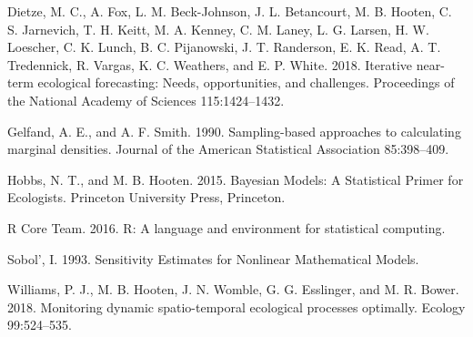 \documentclass[12pt,]{article}
\begin{document}
\leavevmode\hypertarget{ref-Dietze2018}{}%
Dietze, M. C., A. Fox, L. M. Beck-Johnson, J. L. Betancourt, M. B.
Hooten, C. S. Jarnevich, T. H. Keitt, M. A. Kenney, C. M. Laney, L. G.
Larsen, H. W. Loescher, C. K. Lunch, B. C. Pijanowski, J. T. Randerson,
E. K. Read, A. T. Tredennick, R. Vargas, K. C. Weathers, and E. P.
White. 2018. Iterative near-term ecological forecasting: Needs,
opportunities, and challenges. Proceedings of the National Academy of
Sciences 115:1424--1432.

\leavevmode\hypertarget{ref-Gelfand1990}{}%
Gelfand, A. E., and A. F. Smith. 1990. Sampling-based approaches to
calculating marginal densities. Journal of the American Statistical
Association 85:398--409.

\leavevmode\hypertarget{ref-Hobbs2015}{}%
Hobbs, N. T., and M. B. Hooten. 2015. Bayesian Models: A Statistical
Primer for Ecologists. Princeton University Press, Princeton.

\leavevmode\hypertarget{ref-R2016}{}%
R Core Team. 2016. R: A language and environment for statistical
computing.

\leavevmode\hypertarget{ref-Sobol1993}{}%
Sobol', I. 1993. Sensitivity Estimates for Nonlinear Mathematical
Models.

\leavevmode\hypertarget{ref-Williams2018}{}%
Williams, P. J., M. B. Hooten, J. N. Womble, G. G. Esslinger, and M. R.
Bower. 2018. Monitoring dynamic spatio-temporal ecological processes
optimally. Ecology 99:524--535.
\end{document}
